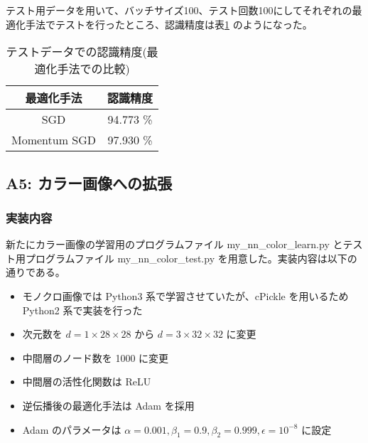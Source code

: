 \documentclass[a4paper,dvipdfmx]{jsarticle}
\begin{document}
テスト用データを用いて、バッチサイズ100、テスト回数100にしてそれぞれの最適化手法でテストを行ったところ、認識精度は表\ref{tableA4} のようになった。\\

\begin{table}[H]
\begin{center}
\caption{テストデータでの認識精度(最適化手法での比較)}
  \begin{tabular}{|c|c|} \hline
    最適化手法 & 認識精度  \\ \hline \hline
    SGD & 94.773 \% \\ \hline
    Momentum SGD & 97.930 \% \\ \hline
  \end{tabular}
	\label{tableA4}
\end{center}
\end{table}

\subsection*{A5: カラー画像への拡張}

\subsubsection*{実装内容}

新たにカラー画像の学習用のプログラムファイル my\_nn\_color\_learn.py とテスト用プログラムファイル my\_nn\_color\_test.py を用意した。実装内容は以下の通りである。

\begin{itemize}
	\item モノクロ画像では Python3 系で学習させていたが、cPickle を用いるため Python2 系で実装を行った
	\item 次元数を $ d=1 \times 28 \times 28 $ から $ d=3 \times 32 \times 32 $ に変更
	\item 中間層のノード数を 1000 に変更
	\item 中間層の活性化関数は ReLU
	\item 逆伝播後の最適化手法は Adam を採用
	\item Adam のパラメータは $\alpha = 0.001, \beta_1 = 0.9, \beta_2 =  0.999, \epsilon = 10^{-8}$ に設定
\end{itemize}
\end{document}
